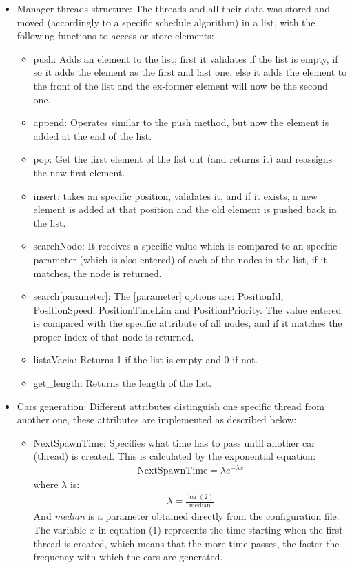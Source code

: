 \documentclass[a4paper,9pt]{article}
\begin{document}
\begin{itemize}
\item Manager threads structure: The threads and all their data was stored and moved (accordingly to a specific schedule algorithm) in a list, with the following functions to access or store elements:
\begin{itemize}
\item push: Adds an element to the list; first it validates if the list is empty, if so it adds the element as the first and last one, else it adds the element to the front of the list and the ex-former element will now be the second one.
\item append: Operates similar to the push method, but now the element is added at the end of the list. 
\item pop: Get the first element of the list out (and returns it) and reassigns the new first element. 
\item insert: takes an specific position, validates it, and if it exists, a new element is added at that position and the old element is pushed back in the list. 
\item searchNodo: It receives a specific value which is compared to an specific parameter (which is also entered) of each of the nodes in the list, if it matches, the node is returned.
\item search[parameter]: The [parameter] options are: PositionId, PositionSpeed, PositionTimeLim and PositionPriority. The value entered is compared with the specific attribute of all nodes, and if it matches the proper index of that node is returned. 
\item listaVacia: Returns 1 if the list is empty and 0 if not.
\item get\_length: Returns the length of the list. 
\end{itemize}

\item Cars generation: Different attributes distinguish one specific thread from another one, these attributes are implemented as described below:
\begin{itemize}
\item NextSpawnTime: Specifies what time has to pass until another car (thread) is created. This is calculated by the exponential equation:
\begin{align}
\text{NextSpawnTime} = \lambda e^{-\lambda x}
\end{align}
where $\lambda$ is:
\begin{align*}
\lambda = \frac{\log(2)}{\text{median}}
\end{align*}
And \emph{median} is a parameter obtained directly from the configuration file. The variable $x$ in equation (1) represents the time starting when the first thread is created, which means that the more time passes, the faster the frequency with which the cars are generated.


\end{itemize}
\end{itemize}
\end{document}
